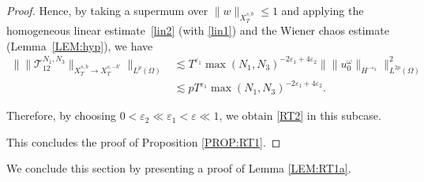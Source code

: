 \documentclass[%
11pt,  reqno]{amsart}
\newcommand{\1}{\hspace{0.2mm}\text{I}\hspace{0.2mm}}
\newcommand{\noi}{\noindent}
\newcommand{\eps}{\varepsilon}
\renewcommand{\o}{\omega}
\renewcommand{\O}{\Omega}
\newcommand{\les}{\lesssim}
\numberwithin{equation}{section}
\numberwithin{theorem}{section}
\newcommand{\TT}{\mathcal{T}}
\begin{document}
\begin{proof}
\noi
Hence, by 
taking a supermum over $\|w\|_{X^{s, b}_T}\le 1$
and 
applying  the homogeneous linear estimate~\eqref{lin2}
(with \eqref{lin1})
and the Wiener chaos estimate (Lemma~\ref{LEM:hyp}), 
 we have
\begin{align*}
\Big\| \| \TT_{12}^{N_1,N_3} \|_{X^{s,b}_T \to 
X^{s,-b'}_T} \Big\|_{L^p (\O)}  
& \les 
T^{\eps_1} \max (N_1, N_3)^{-2\eps_1+ 4\eps_2}
\big\|\| u_0^\o\|_{H^{-\eps_2}}\big\|_{L^{2p} (\O)}^2  \\
& \les p
T^{\eps_1} \max (N_1, N_3)^{-2\eps_1+ 4\eps_2}.
\end{align*}

\noi
Therefore, 
by choosing  $0 < \eps_2 \ll \eps_1 < \eps \ll1$, 
we obtain \eqref{RT2} in this subcase.





\medskip

This concludes  the proof of Proposition \ref{PROP:RT1}.
\end{proof}









We conclude this section by presenting a proof of 
 Lemma \ref{LEM:RT1a}.
\end{document}
